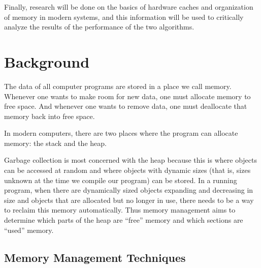 \documentclass[index]{subfiles}
\begin{document}
Finally, research will be done on the basics of hardware caches and organization of memory in modern systems, and this information will be used to critically analyze the results of the performance of the two algorithms.

\section{Background}

The data of all computer programs are stored in a place we call memory. Whenever one wants to make room for new data, one must allocate memory to free space. And whenever one wants to remove data, one must deallocate that memory back into free space.

In modern computers, there are two places where the program can allocate memory: the stack and the heap\cite{the_rust_programming_language}.




Garbage collection is most concerned with the heap because this is where objects can be accessed at random and where objects with dynamic sizes (that is, sizes unknown at the time we compile our program) can be stored. In a running program, when there are dynamically sized objects expanding and decreasing in size and objects that are allocated but no longer in use, there needs to be a way to reclaim this memory automatically. Thus memory management aims to determine which parts of the heap are ``free'' memory and which sections are ``used'' memory.

\subsection{Memory Management Techniques}
\end{document}
